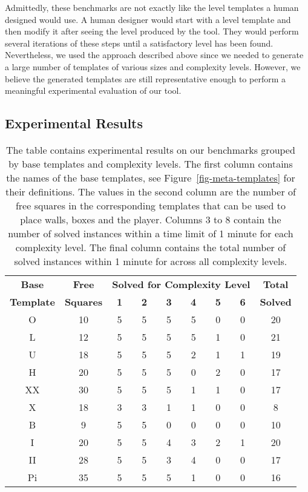 \documentclass[runningheads]{llncs}
\begin{document}
Admittedly, these benchmarks are not exactly like the level templates a human designed would use. A human
designer would start with a level template and then modify it after seeing the level produced by the tool.
They would perform several iterations of these steps until a satisfactory level has been found. Nevertheless,
we used the approach described above since we needed to generate a large number of templates of various
sizes and complexity levels. However, we believe the generated templates are still representative enough
to perform a meaningful experimental evaluation of our tool.

\subsection{Experimental Results}
\begin{table}[t]
\setlength{\tabcolsep}{11pt}
\renewcommand{\arraystretch}{1.25}
\centering
\begin{tabular}{|c|c||c c c c c c|c|}
\hline
\textbf{\textbf{Base}} & \textbf{\textbf{Free}} & \multicolumn{6}{c|}{\textbf{Solved for Complexity Level}} & \textbf{Total} \\ 
\textbf{Template} & \textbf{Squares} & \textbf{1} & \textbf{2} & \textbf{3} & \textbf{4} & \textbf{5} & \textbf{6} & \textbf{Solved} \\ 
\hline 
\rowcolor{mygray} 
O  & 10 &   5 &  5 &  5  & 5 &  0 &  0 & 20 \\
L  & 12 &   5 &  5 &  5  & 5 &  1 &  0 & 21 \\
\rowcolor{mygray} 
U  & 18 &   5 &  5 &  5  & 2 &  1 &  1 & 19 \\
H  & 20 &   5 &  5 &  5  & 0 &  2 &  0 & 17 \\
\rowcolor{mygray} 
XX & 30 &   5 &  5 &  5  & 1 &  1 &  0 & 17 \\
X  & 18 &   3 &  3 &  1  & 1 &  0 &  0 & 8  \\
\rowcolor{mygray} 
B  & 9  &   5 &  5 &  0  & 0 &  0 &  0 & 10 \\
I  & 20 &   5 &  5 &  4  & 3 &  2 &  1 & 20 \\
\rowcolor{mygray} 
II & 28 &   5 &  5 &  3  & 4 &  0 &  0 & 17 \\
Pi & 35 &   5 &  5 &  5  & 1 &  0 &  0 & 16 \\
\hline 
\end{tabular} 
\vspace{1em}
\caption{The table contains experimental results on our benchmarks grouped by base templates and complexity
levels. The first column contains the names of the base templates, see Figure~\ref{fig-meta-templates} for
their definitions. The values in the second column are the number of free squares in the corresponding templates
that can be used to place walls, boxes and the player.
Columns 3 to 8 contain the number of solved instances within a time limit of 1 minute for each complexity level.
The final column contains the total number of solved instances within 1 minute for across all complexity
levels.}
\label{tab-results}
\end{table}
\end{document}
